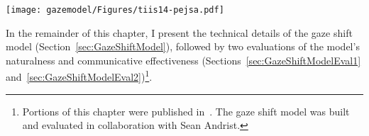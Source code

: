 \begin{figure*}
\centering
\texttt{[image: gazemodel/Figures/tiis14-pejsa.pdf]}
\caption{Examples of gaze shifts synthesized using our model. All gaze shifts are toward the same target (the red sphere). (1) Initially the agent maintains eye contact with the observer. (2) Gaze shift to the target with a low value of the head alignment parameter. (3) Gaze shift in the same direction, but with a high head alignment value. (4) Gaze shift in the same direction with a high torso alignment value. (5) Gaze shift in the same direction with a high whole-body alignment value.}
\label{fig:GazeShiftExamples}
\end{figure*}

In the remainder of this chapter, I present the technical details of the gaze shift model (Section~\ref{sec:GazeShiftModel}), followed by two evaluations of the model's naturalness and communicative effectiveness (Sections~\ref{sec:GazeShiftModelEval1} and~\ref{sec:GazeShiftModelEval2})\footnote{Portions of this chapter were published in~\citet{pejsa2015gaze}. The gaze shift model was built and evaluated in collaboration with Sean Andrist.}.
